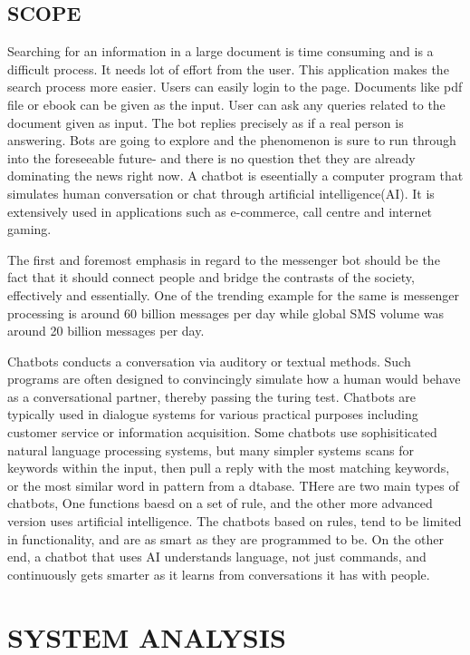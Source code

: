 \documentclass[12pt,a4paper,oneside]{report}
\begin{document}
\section{SCOPE}
\par Searching for an information in a large document is time consuming and is a difficult process. It needs lot of effort from the user. This application makes the search process more easier. Users can easily login to the page. Documents like pdf file or ebook can be given as the input. User can ask any queries related to the document given as input. The bot replies precisely as if a real person is answering. Bots are going to explore and the phenomenon is sure to run through into the foreseeable future- and there is no question thet they are already dominating the news right now. A chatbot is eseentially a computer program that simulates human conversation or chat through artificial intelligence(AI). It is extensively used in applications such as e-commerce, call centre and internet gaming.\\
\par The first and foremost emphasis in regard to the messenger bot should be the fact that it should connect people and bridge the contrasts of the society, effectively and essentially. One of the trending example for the same is messenger processing is around 60 billion messages per day while global SMS volume was around 20 billion messages per day.\\ 
\par Chatbots conducts a conversation via auditory or textual methods. Such programs are often designed to convincingly simulate how a human would behave as a conversational partner, thereby passing the turing test. Chatbots are typically used in dialogue systems for various practical purposes including customer service or information acquisition. Some chatbots use sophisiticated natural language processing systems, but many simpler systems scans for keywords within the input, then pull a reply with the most matching keywords, or the most similar word in pattern from a dtabase. THere are two main types of chatbots, One functions baesd on a set of rule, and the other more advanced version uses artificial intelligence. The chatbots based on rules, tend to be limited in functionality, and are as smart as they are programmed to be. On the other end, a chatbot that uses AI understands language, not just commands, and continuously gets smarter as it learns from conversations it has with people.\\
\chapter{SYSTEM ANALYSIS}
\end{document}
